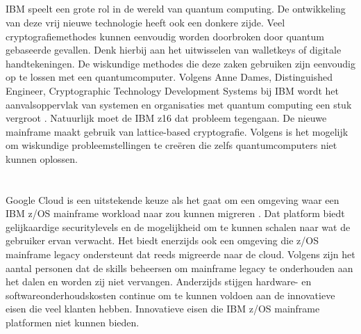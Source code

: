 \subsection{}
\label{sec:Quantum computing en IBM z16}

IBM speelt een grote rol in de wereld van quantum computing. De ontwikkeling van deze vrij nieuwe technologie heeft ook een donkere zijde. Veel cryptografiemethodes kunnen eenvoudig worden doorbroken door quantum gebaseerde gevallen. Denk hierbij aan het uitwisselen van walletkeys of digitale handtekeningen. De wiskundige methodes die deze zaken gebruiken zijn eenvoudig op te lossen met een quantumcomputer. Volgens Anne Dames, Distinguished Engineer, Cryptographic Technology Development Systems bij IBM wordt het aanvalsoppervlak van systemen en organisaties met quantum computing een stuk vergroot \autocite{Almekinders2022}. Natuurlijk moet de IBM z16 dat probleem tegengaan. De nieuwe mainframe maakt gebruik van lattice-based cryptografie. Volgens \textcite{Almekinders2022} is het mogelijk om wiskundige probleemstellingen te creëren die zelfs quantumcomputers niet kunnen oplossen. 

\section{}
\label{sec:IBM Mainframe modernisatie}


\subsection{}
\label{sec:Workloads migreren naar de cloud}


Google Cloud is een uitstekende keuze als het gaat om een omgeving waar een IBM z/OS mainframe workload naar zou kunnen migreren \autocite{Astadia2021}. Dat platform biedt gelijkaardige securitylevels en de mogelijkheid om te kunnen schalen naar wat de gebruiker ervan verwacht. Het biedt enerzijds ook een omgeving die z/OS mainframe legacy ondersteunt dat reeds migreerde naar de cloud. Volgens \textcite{Astadia2021} zijn het aantal personen dat de skills beheersen om mainframe legacy te onderhouden aan het dalen en worden zij niet vervangen. Anderzijds stijgen hardware- en softwareonderhoudskosten continue om te kunnen voldoen aan de innovatieve eisen die veel klanten hebben. Innovatieve eisen die IBM z/OS mainframe platformen niet kunnen bieden. 

